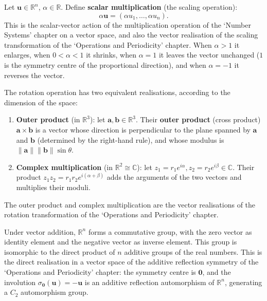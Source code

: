 \begin{definition}\label{def:scalar_multiplication_scaling}
Let $\mathbf{u} \in \mathbb{R}^n$, $\alpha \in \mathbb{R}$. Define \textbf{scalar multiplication} (the scaling operation):
\[\alpha \mathbf{u} = (\alpha u_1, \dots, \alpha u_n).\]
This is the scalar-vector action of the multiplication operation of the `Number Systems' chapter on a vector space, and also the vector realisation of the scaling transformation of the `Operations and Periodicity' chapter. When $\alpha > 1$ it enlarges, when $0 < \alpha < 1$ it shrinks, when $\alpha = 1$ it leaves the vector unchanged ($1$ is the symmetry centre of the proportional direction), and when $\alpha = -1$ it reverses the vector.
\end{definition}

\begin{definition}\label{def:outer_product_rotation}
The rotation operation has two equivalent realisations, according to the dimension of the space:
\begin{enumerate}[label=(\roman*)]
    \item \textbf{Outer product} (in $\mathbb{R}^3$): let $\mathbf{a}, \mathbf{b} \in \mathbb{R}^3$. Their \textbf{outer product} (cross product) $\mathbf{a} \times \mathbf{b}$ is a vector whose direction is perpendicular to the plane spanned by $\mathbf{a}$ and $\mathbf{b}$ (determined by the right-hand rule), and whose modulus is $\|\mathbf{a}\| \|\mathbf{b}\| \sin\theta$.
    \item \textbf{Complex multiplication} (in $\mathbb{R}^2 \cong \mathbb{C}$): let $z_1 = r_1 e^{i\alpha}, z_2 = r_2 e^{i\beta} \in \mathbb{C}$. Their product $z_1 z_2 = r_1 r_2 e^{i(\alpha+\beta)}$ adds the arguments of the two vectors and multiplies their moduli.
\end{enumerate}
The outer product and complex multiplication are the vector realisations of the rotation transformation of the `Operations and Periodicity' chapter.
\end{definition}

\begin{proposition}\label{prop:vector_additive_group}
Under vector addition, $\mathbb{R}^n$ forms a commutative group, with the zero vector as identity element and the negative vector as inverse element. This group is isomorphic to the direct product of $n$ additive groups of the real numbers. This is the direct realisation in a vector space of the additive reflection symmetry of the `Operations and Periodicity' chapter: the symmetry centre is $\mathbf{0}$, and the involution $\sigma_{\mathbf{0}}(\mathbf{u}) = -\mathbf{u}$ is an additive reflection automorphism of $\mathbb{R}^n$, generating a $C_2$ automorphism group.
\end{proposition}

